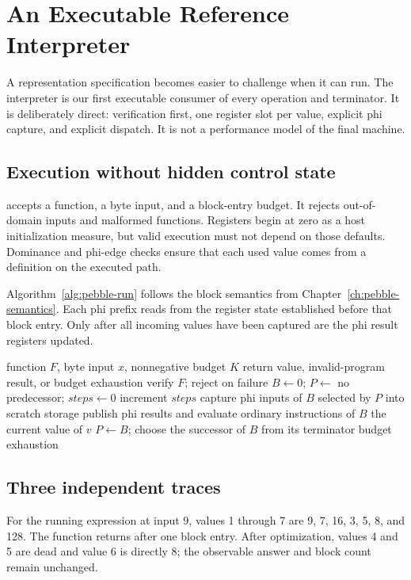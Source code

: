 \chapter{An Executable Reference Interpreter}
\label{ch:pebble-interpreter}

A representation specification becomes easier to challenge when it can run.
The interpreter is our first executable consumer of every operation and terminator.
It is deliberately direct: verification first, one register slot per value, explicit phi capture, and explicit dispatch.
It is not a performance model of the final machine.

\section{Execution without hidden control state}
\label{sec:pebble-interpreter-loop}
 accepts a function, a byte input, and a block-entry budget.
It rejects out-of-domain inputs and malformed functions.
Registers begin at zero as a host initialization measure, but valid execution must not depend on those defaults.
Dominance and phi-edge checks ensure that each used value comes from a definition on the executed path.

Algorithm~\ref{alg:pebble-run} follows the block semantics from Chapter~\ref{ch:pebble-semantics}.
Each phi prefix reads from the register state established before that block entry.
Only after all incoming values have been captured are the phi result registers updated.

\begin{algorithm}[htbp]
\caption{Interpreting a verified function with an explicit block budget.}
\label{alg:pebble-run}
\begin{pseudocode}
\Require function $F$, byte input $x$, nonnegative budget $K$
\Ensure return value, invalid-program result, or budget exhaustion
\State verify $F$; reject on failure
\State $B\gets0$; $P\gets$ no predecessor; $steps\gets0$
\State increment $steps$
\State capture phi inputs of $B$ selected by $P$ into scratch storage
\State publish phi results and evaluate ordinary instructions of $B$
 \State \Return the current value of $v$ \EndIf
\State $P\gets B$; choose the successor of $B$ from its terminator
\EndWhile
\State \Return budget exhaustion
\end{pseudocode}
\end{algorithm}

\section{Three independent traces}
\label{sec:pebble-interpreter-traces}
For the running expression at input 9, values 1 through 7 are 9, 7, 16, 3, 5, 8, and 128.
The function returns after one block entry.
After optimization, values 4 and 5 are dead and value 6 is directly 8; the observable answer and block count remain unchanged.


